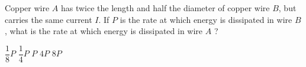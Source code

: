 \begin{questions}\setcounter{question}{22}\question
Copper wire $A$ has twice the length and half the diameter of copper wire $B$, but carries the same current $I$. If $P$ is the rate at which energy is dissipated in wire $B$, what is the rate at which energy is dissipated in wire $A$ ?

\begin{oneparchoices}
\choice $\dfrac{1}{8} P$
\choice $\dfrac{1}{4} P$
\choice $P$
\choice $4 P$
\choice $8 P$
\end{oneparchoices}\end{questions}

